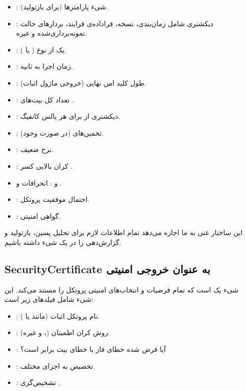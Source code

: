 \begin{itemize}
	\item {}: شیء پارامترها (برای بازتولید).
	\item {}: دیکشنری شامل زمان‌بندی، نسخه، فراداده‌ی فرایند، بردارهای حالت نمونه‌برداری‌شده و غیره.
	\item {}: یک  از نوع  ( یا ).
	\item {}: زمان اجرا به ثانیه.
	\item {}: طول کلید امن نهایی (خروجی ماژول اثبات).
	\item {}: تعداد کل بیت‌های .
	\item {}: دیکشنری از  برای هر پالس کانفیگ.
	\item {}: تخمین‌های  (در صورت وجود).
	\item {}: نرخ  ضعیف.
	\item {}: کران بالایی کسر .
	\item {} و : انحرافات  و .
	\item {}: احتمال موفقیت پروتکل.
	\item {}: گواهی امنیتی.
\end{itemize}

این ساختار غنی به ما اجازه می‌دهد تمام اطلاعات لازم برای تحلیل پسین، بازتولید و گزارش‌دهی را در یک شیء داشته باشیم.

\subsection{SecurityCertificate به عنوان خروجی امنیتی}

شیء  یک  است که تمام فرضیات و انتخاب‌های امنیتی پروتکل را مستند می‌کند. این شیء شامل فیلدهای زیر است:

\begin{itemize}
	\item {}: نام پروتکل اثبات (مانند  یا ).
	\item {}: روش کران اطمینان (،  و غیره).
	\item {}: آیا فرض شده خطای فاز با خطای بیت برابر است؟
	\item {}: تخصیص \lr{$\varepsilon$} به اجزای مختلف.
	\item {}: تشخیص‌گری .
\end{itemize}

